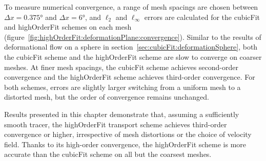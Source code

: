 To measure numerical convergence, a range of mesh spacings are chosen between $\Delta x = \ang{0.375}$ and $\Delta x = \ang{6}$, and $\ell_2$ and $\ell_\infty$ errors are calculated for the cubicFit and highOrderFit schemes on each mesh (figure~\ref{fig:highOrderFit:deformationPlane:convergence}).
Similar to the results of deformational flow on a sphere in section~\ref{sec:cubicFit:deformationSphere}, both the cubicFit scheme and the highOrderFit scheme are slow to converge on coarser meshes.
At finer mesh spacings, the cubicFit scheme achieves second-order convergence and the highOrderFit scheme achieves third-order convergence.
For both schemes, errors are slightly larger switching from a uniform mesh to a distorted mesh, but the order of convergence remains unchanged.

Results presented in this chapter demonstrate that, assuming a sufficiently smooth tracer, the highOrderFit transport scheme achieves third-order convergence or higher, irrespective of mesh distortions or the choice of velocity field.
Thanks to its high-order convergence, the highOrderFit scheme is more accurate than the cubicFit scheme on all but the coarsest meshes.
